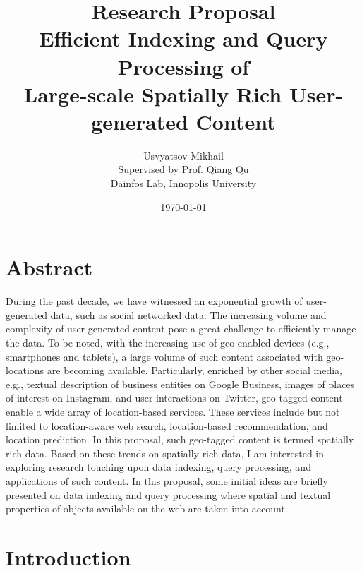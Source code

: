 \documentclass[11pt,a4paper]{article}
\begin{document}
 	\title{Research Proposal \\\vspace{7px} Efficient Indexing and Query Processing of\\ Large-scale Spatially Rich User-generated Content\vspace{-1ex}}
 	\author{Usvyatsov Mikhail\\
 		\normalsize Supervised by Prof. Qiang Qu\\
 		\href{http://www.dainfos.com}{Dainfos Lab, Innopolis University}\\  \vspace{-1ex}}
 	\date{\normalsize \today\vspace{-1ex}}
 	\maketitle
 	
 	\section{Abstract}
 	
 	During the past decade, we have witnessed an exponential growth of user-generated data, such as social networked data.
 	The increasing volume and complexity of user-generated content pose a great challenge to efficiently manage the data.  
 	To be noted, with the increasing use of geo-enabled devices (e.g., smartphones and tablets), a large volume of such content associated with geo-locations are becoming available. Particularly, enriched by other social media, e.g., textual description of business entities on Google Business, images of places of interest on Instagram, and user interactions on Twitter,  geo-tagged content enable a wide array of location-based services. These services include but not limited to location-aware web search, location-based recommendation, and location prediction. In this proposal,  such geo-tagged content is termed spatially rich data. Based on these trends on spatially rich data, I am interested in exploring research touching upon data indexing, query processing, and applications of such content. In this proposal,  some initial ideas are briefly presented on data indexing and query processing where spatial and textual properties of objects available on the web are taken into account. 
 	
 	\section{Introduction}
 	
\end{document}
